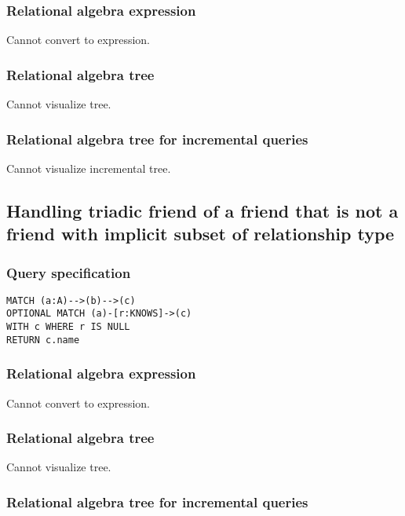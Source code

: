 \subsubsection*{Relational algebra expression}

Cannot convert to expression.

\subsubsection*{Relational algebra tree}

Cannot visualize tree.

\subsubsection*{Relational algebra tree for incremental queries}

Cannot visualize incremental tree.

\subsection{Handling triadic friend of a friend that is not a friend with implicit subset of relationship type}

\subsubsection*{Query specification}

\begin{lstlisting}
MATCH (a:A)-->(b)-->(c)
OPTIONAL MATCH (a)-[r:KNOWS]->(c)
WITH c WHERE r IS NULL
RETURN c.name
\end{lstlisting}

\subsubsection*{Relational algebra expression}

Cannot convert to expression.

\subsubsection*{Relational algebra tree}

Cannot visualize tree.

\subsubsection*{Relational algebra tree for incremental queries}

